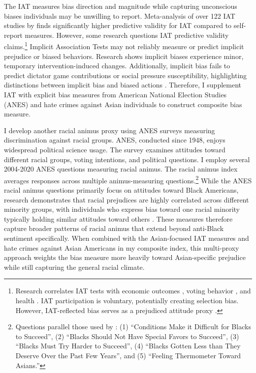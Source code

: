 The IAT measures bias direction and magnitude while capturing unconscious biases individuals may be unwilling to report. Meta-analysis of over 122 IAT studies by \textcite{greenwaldMeasuringIndividualDifferences1998} finds significantly higher predictive validity for IAT compared to self-report measures. However, some research questions IAT predictive validity claims.\footnote{Research correlates IAT tests with economic outcomes \autocite{chettyRaceEconomicOpportunity2020,gloverDiscriminationSelfFulfillingProphecy2017}, voting behavior \autocite{friesePredictingVotingBehavior2007}, and health \autocite{leitnerRacialBiasAssociated2016}. IAT participation is voluntary, potentially creating selection bias. However, IAT-reflected bias serves as a prejudiced attitude proxy \autocite{chettyRaceEconomicOpportunity2020}.} Implicit Association Tests may not reliably measure or predict implicit prejudice or biased behaviors. Research shows implicit biases experience minor, temporary intervention-induced changes. Additionally, implicit bias fails to predict dictator game contributions or social pressure susceptibility, highlighting distinctions between implicit bias and biased actions \autocite{arkesAttributionsImplicitPrejudice2004,forscherMetaanalysisProceduresChange2019,leeDoesImplicitBias2018}. Therefore, I supplement IAT with explicit bias measures from American National Election Studies (ANES) and hate crimes against Asian individuals to construct composite bias measure.

I develop another racial animus proxy using ANES surveys \autocite{anes2021} measuring discrimination against racial groups. ANES, conducted since 1948, enjoys widespread political science usage. The survey examines attitudes toward different racial groups, voting intentions, and political questions. I employ several 2004-2020 ANES questions measuring racial animus. The racial animus index averages responses across multiple animus-measuring questions.\footnote{Questions parallel those used by \textcite{charlesPrejudiceWagesEmpirical2008}: (1) ``Conditions Make it Difficult for Blacks to Succeed'', (2) ``Blacks Should Not Have Special Favors to Succeed'', (3) ``Blacks Must Try Harder to Succeed'', (4) ``Blacks Gotten Less than They Deserve Over the Past Few Years'', and (5) ``Feeling Thermometer Toward Asians.''} While the ANES racial animus questions primarily focus on attitudes toward Black Americans, research demonstrates that racial prejudices are highly correlated across different minority groups, with individuals who express bias toward one racial minority typically holding similar attitudes toward others \autocite{almasalkhi2023links, mora2020antiblackness}. These measures therefore capture broader patterns of racial animus that extend beyond anti-Black sentiment specifically. When combined with the Asian-focused IAT measures and hate crimes against Asian Americans in my composite index, this multi-proxy approach weights the bias measure more heavily toward Asian-specific prejudice while still capturing the general racial climate.

